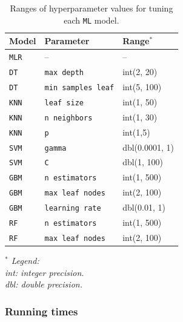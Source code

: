 \documentclass[12pt]{article}
\begin{document}
\FloatBarrier
\begin{table}[h]
\centering
\tiny
{}
\begin{tabular}{p{3cm}p{3cm}p{3cm}}
\toprule
\textbf{Model} & \textbf{Parameter} & \textbf{Range$^*$}\\
\midrule
\texttt{MLR} & -- & --\\
\texttt{DT} & \texttt{max depth} & int(2, 20)\\
\texttt{DT} & \texttt{min samples leaf} & int(5, 100) \\
\texttt{KNN} & \texttt{leaf size} & int(1, 50) \\
\texttt{KNN} & \texttt{n neighbors} & int(1, 30) \\
\texttt{KNN} & \texttt{p} & int(1,5) \\
\texttt{SVM} & \texttt{gamma} & dbl(0.0001, 1)\\
\texttt{SVM} & \texttt{C} & dbl(1, 100)\\
\texttt{GBM} & \texttt{n estimators} & int(1, 500)\\
\texttt{GBM} & \texttt{max leaf nodes} & int(2, 100)\\
\texttt{GBM} & \texttt{learning rate} & dbl(0.01, 1)\\
\texttt{RF} & \texttt{n estimators} & int(1, 500)\\
\texttt{RF} & \texttt{max leaf nodes} & int(2, 100)\\
\bottomrule
\end{tabular}
\smallskip
    \parbox[t]{10cm}{\footnotesize
      \textit{$^*$ Legend: \\
      int: integer precision. \\ 
      dbl: double precision.}
    }
\caption{Ranges of hyperparameter values for tuning each \texttt{ML} model.}
\label{tab:parameters}
\end{table}

\subsubsection{Running times} \label{sec:datagen:proceval:runtim}
\end{document}
